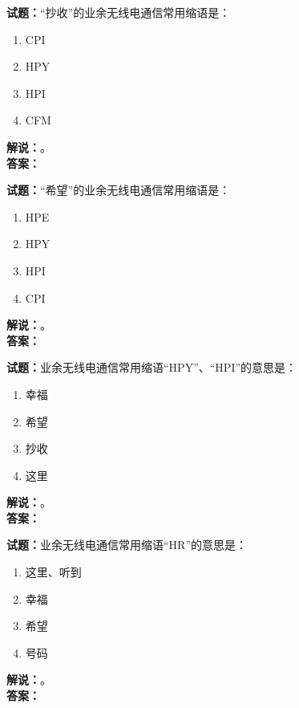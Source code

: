 \documentclass{ctexbook}
\begin{document}
\noindent\textbf{试题：}“抄收”的业余无线电通信常用缩语是：
\begin{enumerate}[leftmargin=3em]
  \item CPI
  \item HPY
  \item HPI
  \item CFM
\end{enumerate}
\noindent\textbf{解说：}\textbf{}。\\\noindent\textbf{答案：}

\vspace{\baselineskip}

\noindent\textbf{试题：}“希望”的业余无线电通信常用缩语是：
\begin{enumerate}[leftmargin=3em]
  \item HPE
  \item HPY
  \item HPI
  \item CPI
\end{enumerate}
\noindent\textbf{解说：}\textbf{}。\\\noindent\textbf{答案：}

\vspace{\baselineskip}

\noindent\textbf{试题：}业余无线电通信常用缩语“HPY”、“HPI”的意思是：
\begin{enumerate}[leftmargin=3em]
  \item 幸福
  \item 希望
  \item 抄收
  \item 这里
\end{enumerate}
\noindent\textbf{解说：}\textbf{}。\\\noindent\textbf{答案：}

\vspace{\baselineskip}

\noindent\textbf{试题：}业余无线电通信常用缩语“HR”的意思是：
\begin{enumerate}[leftmargin=3em]
  \item 这里、听到
  \item 幸福
  \item 希望
  \item 号码
\end{enumerate}
\noindent\textbf{解说：}\textbf{}。\\\noindent\textbf{答案：}

\vspace{\baselineskip}
\end{document}
